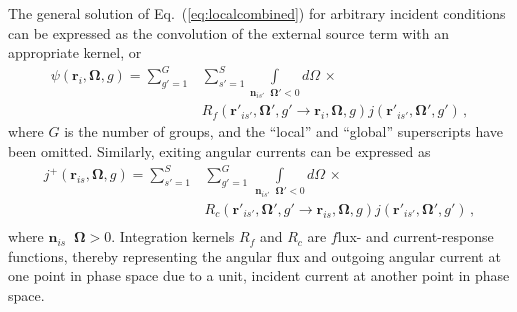 \documentclass[5p,times,twocolumn,10pt]{elsarticle}
\newcommand{\oper}[1]{\mathcal{#1}}
\newcommand{\EQ}[1]{Eq.~(\ref{#1})}               %
\DeclareMathOperator*{\dotp}{{\scriptscriptstyle \stackrel{\bullet}{{}}}}
\begin{document}
  The general solution of \EQ{eq:localcombined} for
  arbitrary incident conditions can be expressed as 
  the convolution of the external 
  source term with an appropriate kernel, or
  \begin{equation}
    \begin{split}
      \psi(\mathbf{r}_i, \bm{\Omega},g) =   
      \sum^{G}_{g'=1} &  \sum^{S}_{s'=1}  
      \int\limits_{\mathbf{n}_{is'} \dotp \bm{\Omega}' < 0} d\Omega \, \times \\ 
      & R_{f}(\mathbf{r}'_{is'},\bm{\Omega}',g' \rightarrow \mathbf{r}_i,\bm{\Omega},g)        
      j (\mathbf{r}'_{is'},\bm{\Omega}', g')  \, ,             
    \end{split}           
    \label{eq:localflux}
  \end{equation}
  where $G$ is the number of groups, 
  and the ``local'' and ``global'' superscripts have been omitted.
  Similarly, exiting angular currents can be expressed as 
  \begin{equation}
    \begin{split}
      j^+(\mathbf{r}_{is},\bm{\Omega},g) =    
      \sum^{S}_{s'=1} &  \sum^{G}_{g'=1}  \,
      \int\limits_{\mathbf{n}_{is'} \dotp \bm{\Omega}' < 0} d\Omega \, \times \\
      & R_{c}(\mathbf{r}'_{is'},\bm{\Omega}' ,g' \rightarrow \mathbf{r}_{is},\bm{\Omega},g)        
      j (\mathbf{r}'_{is'},\bm{\Omega}', g')  \, , \\
    \end{split}   
    \label{eq:localj}
  \end{equation}
  where $\mathbf{n}_{is} \dotp \bm{\Omega} > 0$.
  Integration kernels $R_{f}$ and $R_{c}$ are 
  $f$lux- and $c$urrent-response functions, thereby representing 
  the angular flux and outgoing angular current at 
  one point in phase space due to 
  a unit, incident current at another point in phase space.
  
\end{document}
